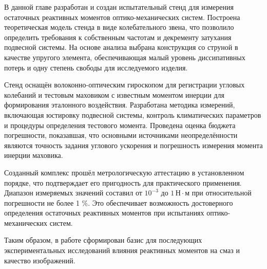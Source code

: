 В данной главе разработан и создан испытательный стенд для измерения остаточных реактивных моментов оптико-механических систем.  
Построена теоретическая модель стенда в виде колебательного звена, что позволило определить требования к собственным частотам и декременту затухания подвесной системы. На основе анализа выбрана конструкция со струной в качестве упругого элемента, обеспечивающая малый уровень диссипативных потерь и одну степень свободы для исследуемого изделия.

Стенд оснащён волоконно-оптическим гироскопом для регистрации угловых колебаний и тестовым маховиком с известным моментом инерции для формирования эталонного воздействия. Разработана методика измерений, включающая юстировку подвесной системы, контроль климатических параметров и процедуры определения тестового момента. Проведена оценка бюджета погрешности, показавшая, что основными источниками неопределённости являются точность задания углового ускорения и погрешность измерения момента инерции маховика.

Созданный комплекс прошёл метрологическую аттестацию в установленном порядке, что подтверждает его пригодность для практического применения. Диапазон измеряемых значений составил от $10^{-3}$ до $1 \,\text{Н}\cdot\text{м}$ при относительной погрешности не более 1 \%. Это обеспечивает возможность достоверного определения остаточных реактивных моментов при испытаниях оптико-механических систем.

Таким образом, в работе сформирован базис для последующих экспериментальных исследований влияния реактивных моментов на смаз и качество изображений. 



\clearpage
\FloatBarrier